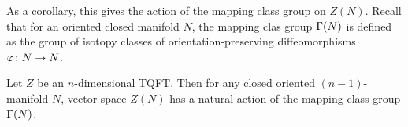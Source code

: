 As a corollary, this gives the action of the mapping class group on $Z(N)$.
Recall that for an oriented  closed manifold $N$, the mapping clas group
 $\Gamma(N)$ is defined as the group of isotopy
classes of orientation-preserving diffeomorphisms $\varphi \colon N\to N$. 



\begin{corollary}\label{c:mapping-class}
  Let $Z$ be an $n$-dimensional TQFT. Then for any closed  oriented $(n-1)$-manifold 
  $N$,  vector space $Z(N)$ has a natural action of the mapping class group $\Gamma(N)$. 
\end{corollary}  

\clearpage
